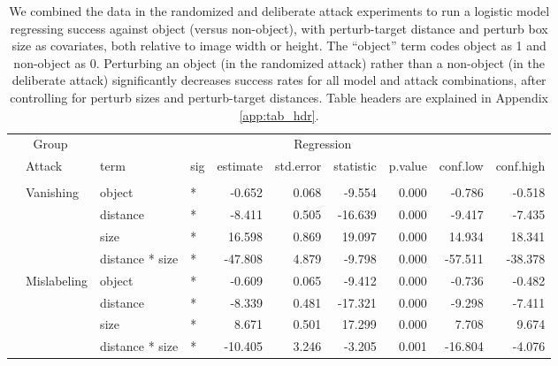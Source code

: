 \documentclass[
]{article}
\begin{document}
\begin{longtable}[t]{llllrrrrrr}
\caption{\label{tab:rand_arb_compare_table}We combined the data in the randomized and deliberate attack experiments to run a logistic model regressing success against object (versus non-object), with perturb-target distance and perturb box size as covariates, both relative to image width or height. The ``object'' term codes object as 1 and non-object as 0. Perturbing an object (in the randomized attack) rather than a non-object (in the deliberate attack) significantly decreases success rates for all model and attack combinations, after controlling for perturb sizes and perturb-target distances. Table headers are explained in Appendix \ref{app:tab_hdr}.}\\
\toprule
\multicolumn{2}{c}{Group} & \multicolumn{8}{c}{Regression} \\
\cmidrule(l{3pt}r{3pt}){1-2} \cmidrule(l{3pt}r{3pt}){3-10}
 & Attack & term & sig & estimate & std.error & statistic & p.value & conf.low & conf.high\\
\midrule
\addlinespace[0.3em]
\multicolumn{10}{l}{\textbf{YOLOv3}}\\
\hspace{1em} & Vanishing & object & * & -0.652 & 0.068 & -9.554 & 0.000 & -0.786 & -0.518\\
\cmidrule{3-10}\nopagebreak
\hspace{1em} &  & distance & * & -8.411 & 0.505 & -16.639 & 0.000 & -9.417 & -7.435\\
\cmidrule{3-10}\nopagebreak
\hspace{1em} &  & size & * & 16.598 & 0.869 & 19.097 & 0.000 & 14.934 & 18.341\\
\cmidrule{3-10}\nopagebreak
\hspace{1em} &  & distance * size & * & -47.808 & 4.879 & -9.798 & 0.000 & -57.511 & -38.378\\
\cmidrule{2-10}\nopagebreak
\hspace{1em} & Mislabeling & object & * & -0.609 & 0.065 & -9.412 & 0.000 & -0.736 & -0.482\\
\cmidrule{3-10}\nopagebreak
\hspace{1em} &  & distance & * & -8.339 & 0.481 & -17.321 & 0.000 & -9.298 & -7.411\\
\cmidrule{3-10}\nopagebreak
\hspace{1em} &  & size & * & 8.671 & 0.501 & 17.299 & 0.000 & 7.708 & 9.674\\
\cmidrule{3-10}\nopagebreak
\hspace{1em} &  & distance * size & * & -10.405 & 3.246 & -3.205 & 0.001 & -16.804 & -4.076\\

\end{longtable}
\end{document}
